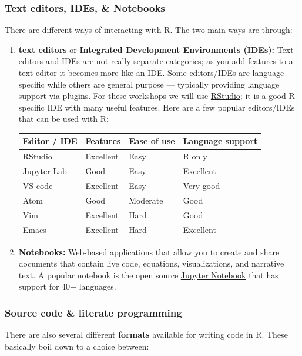 \documentclass[
]{book}
\begin{document}
\hypertarget{text-editors-ides-notebooks}{%
\subsubsection{Text editors, IDEs, \& Notebooks}\label{text-editors-ides-notebooks}}

There are different ways of interacting with R. The two main ways are through:

\begin{enumerate}
\def\labelenumi{\arabic{enumi}.}
\item
  \textbf{text editors} or \textbf{Integrated Development Environments (IDEs):} Text editors and IDEs are not really separate categories; as you add features to a text editor it becomes more like an IDE. Some editors/IDEs are language-specific while others are general purpose --- typically providing language support via plugins. For these workshops we will use \href{https://rstudio.com/}{RStudio}; it is a good R-specific IDE with many useful features. Here are a few popular editors/IDEs that can be used with R:

  \begin{longtable}[]{@{}llll@{}}
  \toprule
  Editor / IDE & Features & Ease of use & Language support\tabularnewline
  \midrule
  \endhead
  RStudio & Excellent & Easy & R only\tabularnewline
  Jupyter Lab & Good & Easy & Excellent\tabularnewline
  VS code & Excellent & Easy & Very good\tabularnewline
  Atom & Good & Moderate & Good\tabularnewline
  Vim & Excellent & Hard & Good\tabularnewline
  Emacs & Excellent & Hard & Excellent\tabularnewline
  \bottomrule
  \end{longtable}
\item
  \textbf{Notebooks:} Web-based applications that allow you to create and share documents that contain live code, equations, visualizations, and narrative text. A popular notebook is the open source \href{https://jupyter.org/}{Jupyter Notebook} that has support for 40+ languages.
\end{enumerate}

\hypertarget{source-code-literate-programming}{%
\subsubsection{Source code \& literate programming}\label{source-code-literate-programming}}

There are also several different \textbf{formats} available for writing code in R. These basically boil down to a choice between:
\end{document}
